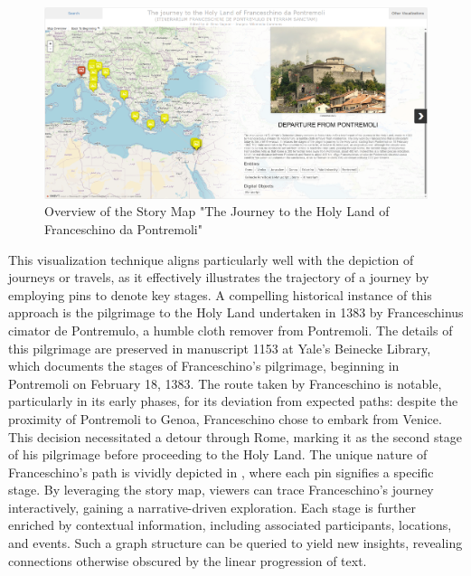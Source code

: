 \begin{figure}[h!tb]
    \centering
    \includegraphics[scale=0.3]{img/franceschinoOverview.png}
    \caption{Overview of the Story Map "The Journey to the Holy Land of Franceschino da Pontremoli"}
    \label{fig:franceschino}
\end{figure}


This visualization technique aligns particularly well with the depiction of journeys or travels, as it effectively illustrates the trajectory of a journey by employing pins to denote key stages. A compelling historical instance of this approach is the pilgrimage to the Holy Land undertaken in 1383 by Franceschinus cimator de Pontremulo, a humble cloth remover from Pontremoli. The details of this pilgrimage are preserved in manuscript 1153 at Yale’s Beinecke Library, which documents the stages of Franceschino's pilgrimage, beginning in Pontremoli on February 18, 1383. The route taken by Franceschino is notable, particularly in its early phases, for its deviation from expected paths: despite the proximity of Pontremoli to Genoa, Franceschino chose to embark from Venice. This decision necessitated a detour through Rome, marking it as the second stage of his pilgrimage before proceeding to the Holy Land. The unique nature of Franceschino's path is vividly depicted in , where each pin signifies a specific stage. By leveraging the story map, viewers can trace Franceschino’s journey interactively, gaining a narrative-driven exploration. Each stage is further enriched by contextual information, including associated participants, locations, and events. Such a graph structure can be queried to yield new insights, revealing connections otherwise obscured by the linear progression of text.


